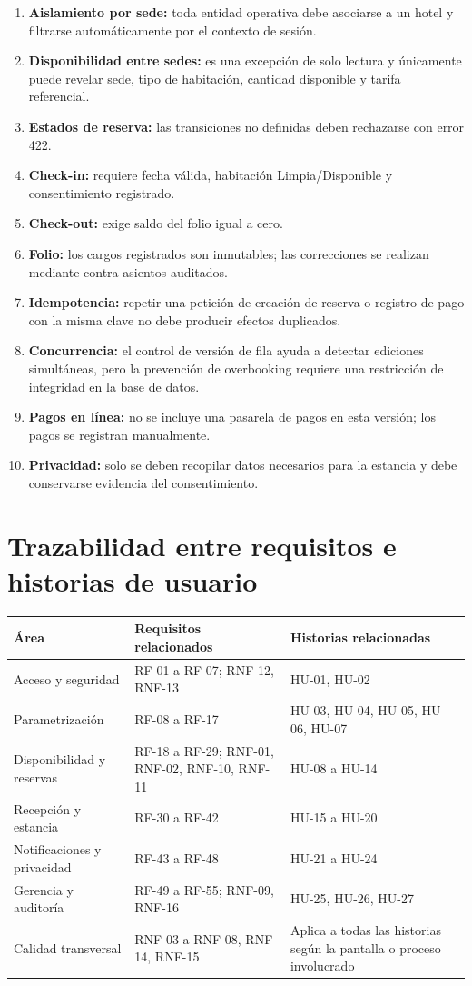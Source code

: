 \documentclass[12pt,a4paper]{article}
\begin{document}
\begin{enumerate}
  \item \textbf{Aislamiento por sede:} toda entidad operativa debe asociarse a un hotel y filtrarse automáticamente por el contexto de sesión.
  \item \textbf{Disponibilidad entre sedes:} es una excepción de solo lectura y únicamente puede revelar sede, tipo de habitación, cantidad disponible y tarifa referencial.
  \item \textbf{Estados de reserva:} las transiciones no definidas deben rechazarse con error 422.
  \item \textbf{Check-in:} requiere fecha válida, habitación Limpia/Disponible y consentimiento registrado.
  \item \textbf{Check-out:} exige saldo del folio igual a cero.
  \item \textbf{Folio:} los cargos registrados son inmutables; las correcciones se realizan mediante contra-asientos auditados.
  \item \textbf{Idempotencia:} repetir una petición de creación de reserva o registro de pago con la misma clave no debe producir efectos duplicados.
  \item \textbf{Concurrencia:} el control de versión de fila ayuda a detectar ediciones simultáneas, pero la prevención de overbooking requiere una restricción de integridad en la base de datos.
  \item \textbf{Pagos en línea:} no se incluye una pasarela de pagos en esta versión; los pagos se registran manualmente.
  \item \textbf{Privacidad:} solo se deben recopilar datos necesarios para la estancia y debe conservarse evidencia del consentimiento.
\end{enumerate}

\section{Trazabilidad entre requisitos e historias de usuario}

\begin{longtable}{p{4.1cm} p{4cm} p{5.2cm}}
\toprule
\textbf{Área} & \textbf{Requisitos relacionados} & \textbf{Historias relacionadas}\\
\midrule
Acceso y seguridad & RF-01 a RF-07; RNF-12, RNF-13 & HU-01, HU-02\\
Parametrización & RF-08 a RF-17 & HU-03, HU-04, HU-05, HU-06, HU-07\\
Disponibilidad y reservas & RF-18 a RF-29; RNF-01, RNF-02, RNF-10, RNF-11 & HU-08 a HU-14\\
Recepción y estancia & RF-30 a RF-42 & HU-15 a HU-20\\
Notificaciones y privacidad & RF-43 a RF-48 & HU-21 a HU-24\\
Gerencia y auditoría & RF-49 a RF-55; RNF-09, RNF-16 & HU-25, HU-26, HU-27\\
Calidad transversal & RNF-03 a RNF-08, RNF-14, RNF-15 & Aplica a todas las historias según la pantalla o proceso involucrado\\
\bottomrule
\end{longtable}
\end{document}
